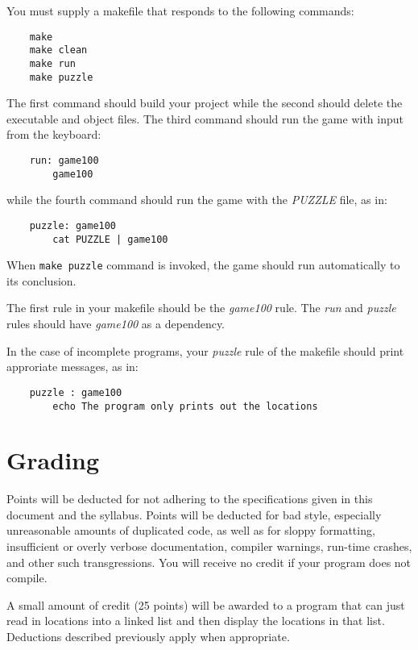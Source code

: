 \documentclass[12pt]{article}
\begin{document}
You must supply a makefile that responds to the following commands:

\begin{verbatim}
    make 
    make clean
    make run
    make puzzle
\end{verbatim}

The first command should build your project while the second should delete
the executable and object files. The third command should run the game
with input from the keyboard:

\begin{verbatim}
    run: game100
        game100
\end{verbatim}

while the fourth command should run the game with the {\it PUZZLE} file, as in:

\begin{verbatim}
    puzzle: game100
        cat PUZZLE | game100
\end{verbatim}

When \verb!make puzzle! command is invoked, the game should run automatically
to its conclusion.

The first rule in your makefile should be the {\it game100} rule.
The {\it run} and {\it puzzle} rules should have {\it game100} as a dependency.

In the case of incomplete programs,
your {\it puzzle} rule
of the makefile
should print approriate
messages, as in:

\begin{verbatim}
    puzzle : game100
        echo The program only prints out the locations
\end{verbatim}

\section*{Grading}

Points will be deducted
for not adhering to the specifications given in this document and the
syllabus. Points will be deducted for bad style, especially unreasonable
amounts of duplicated code, as well as for sloppy formatting, insufficient
or overly verbose documentation, compiler warnings, run-time crashes,
and other such transgressions. You will receive no credit if your program
does not compile.

A small amount of credit (25 points)
will be awarded to a program that can just
read in locations into a linked list and then display the locations
in that list. Deductions described previously apply when appropriate.
\end{document}
